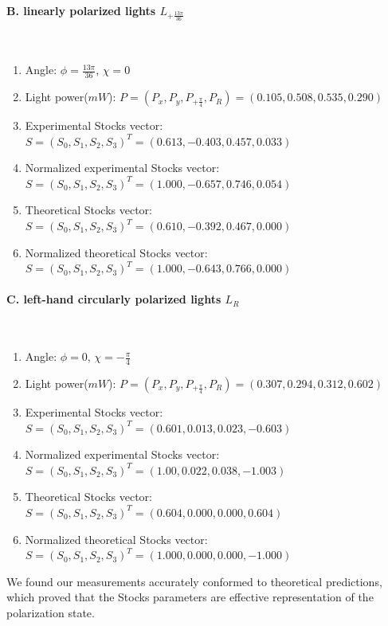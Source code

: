 \documentclass[10pt,a4paper,twocolumn,twoside,UTF8]{article}
\begin{document}
	\paragraph{B. linearly polarized lights $L_{+\frac{13\pi}{36}}$}~
	\newline 
	\indent
	\begin{enumerate}[label=\arabic*.]
		\item Angle: $\phi = \frac{13\pi}{36}$, $\chi = 0$
		\item Light power($mW$): $P = (P_x, P_y, P_{+\frac{\pi}{4}}, P_R) = (0.105, 0.508, 0.535, 0.290)$
		\item Experimental Stocks vector: $S=(S_0, S_1, S_2, S_3)^T = (0.613, -0.403, 0.457, 0.033)$
		\item Normalized experimental Stocks vector: $S=(S_0, S_1, S_2, S_3)^T = (1.000, -0.657, 0.746, 0.054)$
		\item Theoretical Stocks vector: $S=(S_0, S_1, S_2, S_3)^T = (0.610, -0.392, 0.467, 0.000)$
		\item Normalized theoretical Stocks vector: $S=(S_0, S_1, S_2, S_3)^T = (1.000, -0.643, 0.766, 0.000)$
	\end{enumerate}

	\paragraph{C. left-hand circularly polarized lights $L_R$}~
	\newline 
	\indent
	\begin{enumerate}[label=\arabic*.]
		\item Angle: $\phi = 0$, $\chi = -\frac{\pi}{4}$
		\item Light power($mW$): $P = (P_x, P_y, P_{+\frac{\pi}{4}}, P_R) = (0.307, 0.294, 0.312, 0.602)$
		\item Experimental Stocks vector: $S=(S_0, S_1, S_2, S_3)^T = (0.601, 0.013, 0.023, -0.603)$
		\item Normalized experimental Stocks vector: $S=(S_0, S_1, S_2, S_3)^T = (1.00, 0.022, 0.038, -1.003)$
		\item Theoretical Stocks vector: $S=(S_0, S_1, S_2, S_3)^T = (0.604, 0.000, 0.000, 0.604)$
		\item Normalized theoretical Stocks vector: $S=(S_0, S_1, S_2, S_3)^T = (1.000, 0.000, 0.000, -1.000)$
	\end{enumerate}

	We found our measurements accurately conformed to theoretical predictions, which proved that the Stocks parameters are effective representation of the polarization state.
	
\end{document}
